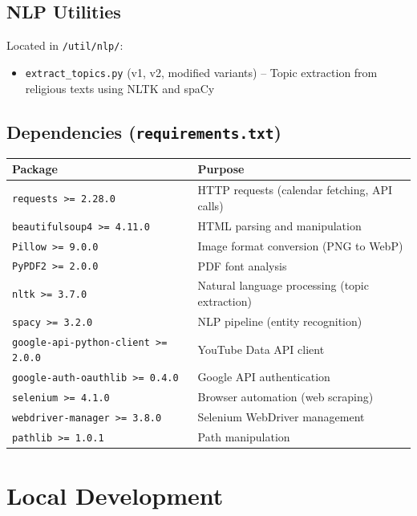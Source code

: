 \documentclass[12pt]{article}
\begin{document}
\subsection{NLP Utilities}

Located in \texttt{/util/nlp/}:
\begin{itemize}
    \item \texttt{extract\_topics.py} (v1, v2, modified variants) -- Topic extraction from religious texts using NLTK and spaCy
\end{itemize}

\subsection{Dependencies (\texttt{requirements.txt})}

{\footnotesize
\begin{longtable}{p{5cm}p{8cm}}
\toprule
\textbf{Package} & \textbf{Purpose} \\
\midrule
\texttt{requests >= 2.28.0} & HTTP requests (calendar fetching, API calls) \\
\texttt{beautifulsoup4 >= 4.11.0} & HTML parsing and manipulation \\
\texttt{Pillow >= 9.0.0} & Image format conversion (PNG to WebP) \\
\texttt{PyPDF2 >= 2.0.0} & PDF font analysis \\
\texttt{nltk >= 3.7.0} & Natural language processing (topic extraction) \\
\texttt{spacy >= 3.2.0} & NLP pipeline (entity recognition) \\
\texttt{google-api-python-client >= 2.0.0} & YouTube Data API client \\
\texttt{google-auth-oauthlib >= 0.4.0} & Google API authentication \\
\texttt{selenium >= 4.1.0} & Browser automation (web scraping) \\
\texttt{webdriver-manager >= 3.8.0} & Selenium WebDriver management \\
\texttt{pathlib >= 1.0.1} & Path manipulation \\
\bottomrule
\end{longtable}
}

\section{Local Development}
\end{document}
